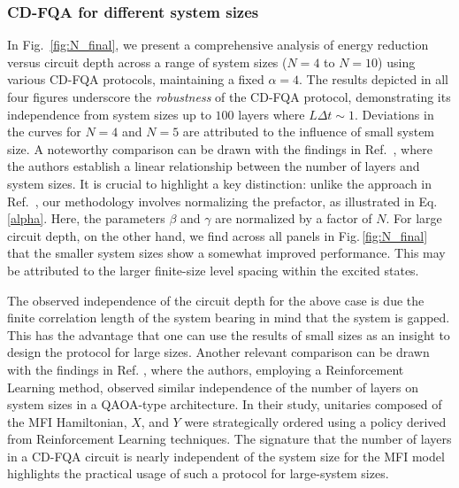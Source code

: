 \documentclass[twocolumn,aps,superscriptaddress,floatfix,longbibliography]{revtex4-2}
\newcommand{\Eq}[1]{Eq.\,\eqref{#1}}
\newcommand{\Fig}[1]{Fig.\,\ref{fig:#1}}
\begin{document}
\subsubsection{CD-FQA for different system sizes}
In Fig.~\ref{fig:N_final}, we present a comprehensive analysis of energy reduction versus circuit depth across a range of system sizes ($N=4$ to $N=10$) using various CD-FQA protocols, maintaining a fixed $\alpha=4$. The results depicted in all four figures underscore the \textit{robustness} of the CD-FQA protocol, demonstrating its independence from system sizes up to $100$ layers where $L\Delta t\sim 1$. Deviations in the curves for $N=4$ and $N=5$ are attributed to the influence of small system size. A noteworthy comparison can be drawn with the findings in Ref.~\cite{FeedbackPRL}, where the authors establish a linear relationship between the number of layers and system sizes. It is crucial to highlight a key distinction: unlike the approach in Ref.~\cite{FeedbackPRL}, our methodology involves normalizing the prefactor, as illustrated in \Eq{alpha}. Here, the parameters $\beta$ and $\gamma$ are normalized by a factor of $N$. 
For large circuit depth, %
on the other hand,
we find across all panels in \Fig{N_final}
that the smaller system sizes show a somewhat
improved performance. This may be attributed
to the larger finite-size level spacing within
the excited states.

The observed  
independence of the circuit depth for the above case is due the finite correlation length of the system
bearing in mind that the system is gapped. This 
has the advantage that
one can use the results of small sizes as an insight to design the protocol for large sizes.
Another relevant
comparison can be drawn with the findings in Ref. \cite{yao2021reinforcement}, where the authors, employing a
Reinforcement Learning method, observed similar independence of the number of layers on system sizes in a QAOA-type
architecture. In their study, unitaries composed of the MFI
Hamiltonian, $X$, and $Y$ were strategically ordered using a
policy derived from Reinforcement Learning techniques. The signature that the number of layers in a CD-FQA circuit is
nearly independent of the system size for the MFI model highlights the practical usage of such a protocol for large-system sizes. 
\end{document}
